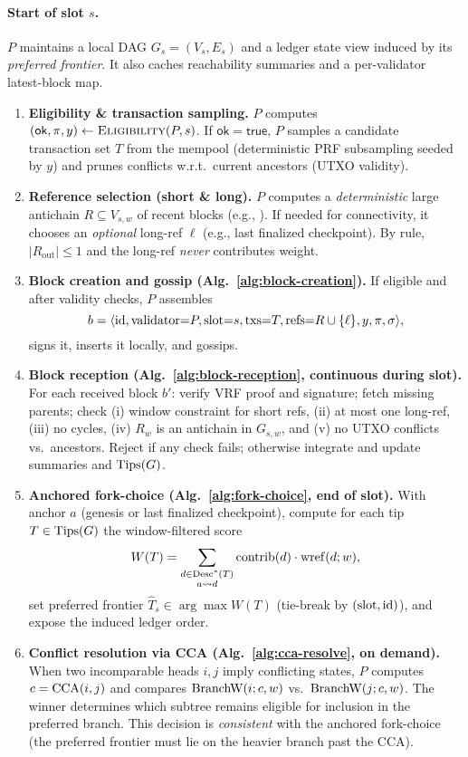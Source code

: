 \paragraph{Start of slot $s$.}
$P$ maintains a local DAG $G_s=(V_s,E_s)$ and a ledger state view induced by its \emph{preferred frontier}. It also caches reachability summaries and a per-validator latest-block map.

\begin{enumerate}
  \item \textbf{Eligibility \& transaction sampling.}
  $P$ computes $(\mathsf{ok},\pi,y)\leftarrow\textsc{Eligibility}(P,s)$. If $\mathsf{ok}=\textsf{true}$, $P$ samples a candidate transaction set $T$ from the mempool (deterministic PRF subsampling seeded by $y$) and prunes conflicts w.r.t.\ current ancestors (UTXO validity).

  \item \textbf{Reference selection (short \& long).}
  $P$ computes a \emph{deterministic} large antichain $R\subseteq V_{s,w}$ of recent blocks (e.g., \GreedyAntichain). If needed for connectivity, it chooses an \emph{optional} long-ref $\ell$ (e.g., last finalized checkpoint). By rule, $|R_{\text{out}}|\le1$ and the long-ref \emph{never} contributes weight.

  \item \textbf{Block creation and gossip (Alg.~\ref{alg:block-creation}).}
  If eligible and after validity checks, $P$ assembles
  \[
  b=\langle 
  \mathrm{id},\mathrm{validator}{=}P,\mathrm{slot}{=}s,\mathrm{txs}{=}T,\mathrm{refs}{=}R\cup\{\ell\},y,\pi,\sigma\rangle,
  \]
  signs it, inserts it locally, and gossips.

  \item \textbf{Block reception (Alg.~\ref{alg:block-reception}, continuous during slot).}
  For each received block $b'$: verify VRF proof and signature; fetch missing parents; check (i) window constraint for short refs, (ii) at most one long-ref, (iii) no cycles, (iv) $R_w$ is an antichain in $G_{s,w}$, and (v) no UTXO conflicts vs.\ ancestors. Reject if any check fails; otherwise integrate and update summaries and $\mathrm{Tips}(G)$.

  \item \textbf{Anchored fork-choice (Alg.~\ref{alg:fork-choice}, end of slot).}
  With anchor $a$ (genesis or last finalized checkpoint), compute for each tip $T\in\mathrm{Tips}(G)$ the window-filtered score
  \[
  W(T)=\sum_{\substack{d\in\mathrm{Desc}^*(T)\\a\leadsto d}}\mathrm{contrib}(d)\cdot 
  \mathrm{wref}(d;w),
  \]
  set preferred frontier $\hat T_s\in\arg\max W(T)$ (tie-break by $(\mathrm{slot},\mathrm{id})$), and expose the induced ledger order.

  \item \textbf{Conflict resolution via CCA (Alg.~\ref{alg:cca-resolve}, on demand).}
  When two incomparable heads $i,j$ imply conflicting states, $P$ computes $c=\mathrm{CCA}(i,j)$ and compares $\mathrm{BranchW}(i;c,w)$ vs.\ $\mathrm{BranchW}(j;c,w)$. The winner determines which subtree remains eligible for inclusion in the preferred branch. This decision is \emph{consistent} with the anchored fork-choice (the preferred frontier must lie on the heavier branch past the CCA).
\end{enumerate}

